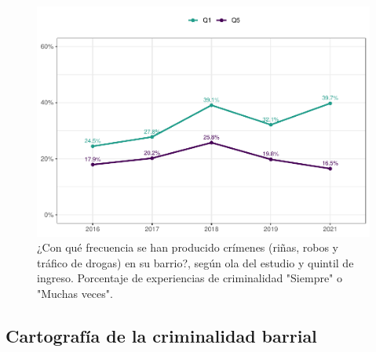 \documentclass[
  12pt,
]{book}
\begin{document}
\begin{figure}

{\centering \includegraphics{reporte-elsoc_files/figure-latex/crim-quintil-1} 

}

\caption{¿Con qué frecuencia se han producido crímenes (riñas, robos y tráfico de drogas) en su barrio?, según ola del estudio y quintil de ingreso. Porcentaje de experiencias de criminalidad "Siempre" o "Muchas veces".}\label{fig:crim-quintil}
\end{figure}

\hypertarget{cartografuxeda-de-la-criminalidad-barrial}{%
\subsection{Cartografía de la criminalidad barrial}\label{cartografuxeda-de-la-criminalidad-barrial}}
\end{document}
